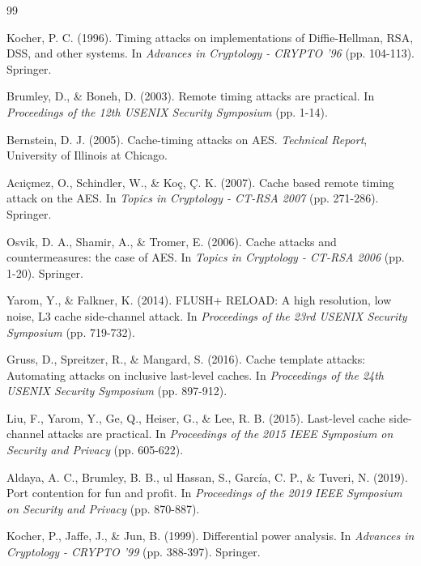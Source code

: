 \documentclass[12pt,a4paper]{article}
\theoremstyle{definition}
\begin{document}
\begin{thebibliography}{99}

Kocher, P. C. (1996).
\newblock Timing attacks on implementations of Diffie-Hellman, RSA, DSS, and other systems.
\newblock In \textit{Advances in Cryptology - CRYPTO '96} (pp. 104-113). Springer.

Brumley, D., \& Boneh, D. (2003).
\newblock Remote timing attacks are practical.
\newblock In \textit{Proceedings of the 12th USENIX Security Symposium} (pp. 1-14).

Bernstein, D. J. (2005).
\newblock Cache-timing attacks on AES.
\newblock \textit{Technical Report}, University of Illinois at Chicago.

Acıiçmez, O., Schindler, W., \& Koç, Ç. K. (2007).
\newblock Cache based remote timing attack on the AES.
\newblock In \textit{Topics in Cryptology - CT-RSA 2007} (pp. 271-286). Springer.

Osvik, D. A., Shamir, A., \& Tromer, E. (2006).
\newblock Cache attacks and countermeasures: the case of AES.
\newblock In \textit{Topics in Cryptology - CT-RSA 2006} (pp. 1-20). Springer.

Yarom, Y., \& Falkner, K. (2014).
\newblock FLUSH+ RELOAD: A high resolution, low noise, L3 cache side-channel attack.
\newblock In \textit{Proceedings of the 23rd USENIX Security Symposium} (pp. 719-732).

Gruss, D., Spreitzer, R., \& Mangard, S. (2016).
\newblock Cache template attacks: Automating attacks on inclusive last-level caches.
\newblock In \textit{Proceedings of the 24th USENIX Security Symposium} (pp. 897-912).

Liu, F., Yarom, Y., Ge, Q., Heiser, G., \& Lee, R. B. (2015).
\newblock Last-level cache side-channel attacks are practical.
\newblock In \textit{Proceedings of the 2015 IEEE Symposium on Security and Privacy} (pp. 605-622).

Aldaya, A. C., Brumley, B. B., ul Hassan, S., García, C. P., \& Tuveri, N. (2019).
\newblock Port contention for fun and profit.
\newblock In \textit{Proceedings of the 2019 IEEE Symposium on Security and Privacy} (pp. 870-887).

Kocher, P., Jaffe, J., \& Jun, B. (1999).
\newblock Differential power analysis.
\newblock In \textit{Advances in Cryptology - CRYPTO '99} (pp. 388-397). Springer.


\end{thebibliography}
\end{document}
